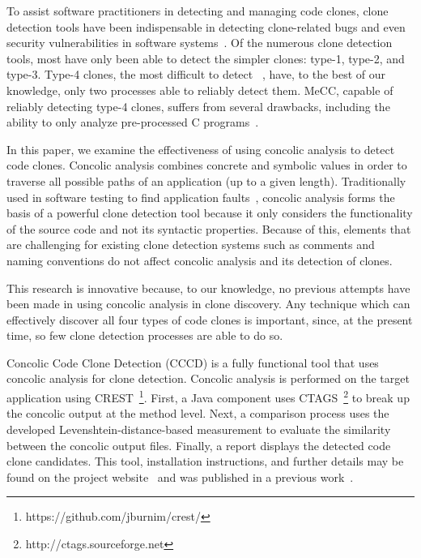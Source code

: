 \documentclass[smallextended]{svjour3}       %
\begin{document}
To assist software practitioners in detecting and managing code clones, clone detection tools have been indispensable in detecting clone-related bugs and even security vulnerabilities in software systems~\cite{Dang:2012:XTC:2420950.2421004}. Of the numerous clone detection tools, most have only been able to detect the simpler clones: type-1, type-2, and type-3. Type-4 clones, the most difficult to detect ~\cite{Yuan:2011:CCM:2114489.2114766,Roy07asurvey}, have, to the best of our knowledge, only two processes able to reliably detect them. MeCC, capable of reliably detecting type-4 clones, suffers from several drawbacks, including the ability to only analyze pre-processed C programs~\cite{Kim:2011:MMC:1985793.1985835}.

In this paper, we examine the effectiveness of using concolic analysis to detect code clones. Concolic analysis combines concrete and symbolic values in order to traverse all possible paths of an application (up to a given length). Traditionally used in software testing to find application faults~\cite{Kim:2012:IAC:2337223.2337373, Kiezun:2013:HSW:2377656.2377662}, concolic analysis forms the basis of a powerful clone detection tool because it only considers the functionality of the source code and not its syntactic properties. Because of this, elements that are challenging for existing clone detection systems such as comments and naming conventions do not affect concolic analysis and its detection of clones.

This research is innovative because, to our knowledge, no previous attempts have been made in using concolic analysis in clone discovery. Any technique which can effectively discover all four types of code clones is important, since, at the present time, so few clone detection processes are able to do so.

Concolic Code Clone Detection (CCCD) is a fully functional tool that uses concolic analysis for clone detection. Concolic analysis is performed on the target application using CREST~\footnote{https://github.com/jburnim/crest/}. First, a Java component uses CTAGS~\footnote{http://ctags.sourceforge.net} to break up the concolic output at the method level. Next, a comparison process uses the developed Levenshtein-distance-based measurement to evaluate the similarity between the concolic output files. Finally, a report displays the detected code clone candidates. This tool, installation instructions, and further details may be found on the project website~\cite{cccd_url} and was published in a previous work~\cite{wcre2013}.
\end{document}
